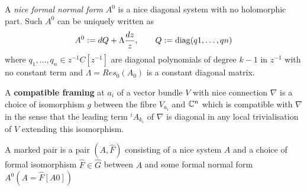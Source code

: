 \begin{paracol}{2}
\switchcolumn %
\begin{defn}
A \emph{nice formal normal form} $A^0$ is a nice diagonal system with no
holomorphic part. Such $A^0$ can be uniquely written as
\[
A^0:= dQ + \Lambda \frac{dz}{z},
\qquad
Q := \operatorname{diag}(q1,\dots ,qn)
\]
where $q_1,\dots ,q_n\in z^{−1}C[z^{−1}]$ are diagonal polynomials of degree
$k-1$ in $z^{−1}$ with no
constant term and $\Lambda = Res_0(A_0)$ is a constant diagonal matrix.
\end{defn}
\end{paracol}


\begin{paracol}{2}
\begin{defn}
A \textbf{compatible framing} at $a_i$ of a vector bundle $V$ with nice
connection $\nabla$ is a choice of isomorphism $g$ between the fibre
$V_{a_i}$ and $\mathbb{C}^n$ which is compatible with $\nabla$ in the sense that the
leading term ${}^iA_{k_i}$ of $\nabla$ is diagonal in any local
trivialisation of $V$ extending this isomorphism.
\end{defn}
\switchcolumn %
\begin{defn}
A marked pair is a pair $(A, \hat F)$ consisting of a nice system $A$ and a choice of formal
isomorphism
$\hat F \in \hat G$
between $A$ and some formal normal form $A^0(A = \hat F[A0])$
\end{defn}
\end{paracol}


